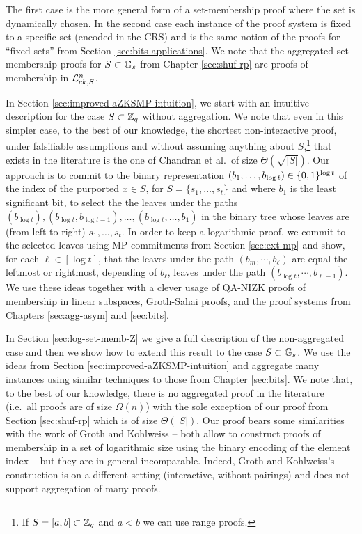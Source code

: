 The first case is the more general form of a set-membership proof where the set is dynamically chosen. In the second case each instance of the proof system is fixed to a specific set (encoded in the CRS) and is the same notion of the proofs for ``fixed sets'' from Section \ref{sec:bits-applications}. We note that the aggregated set-membership proofs for $S\subset\mathbb{G}_s$ from Chapter \ref{sec:shuf-rp} are proofs of membership in $\mathcal{L}_{ck,S}^n$.

In Section \ref{sec:improved-aZKSMP-intuition}, we start with an intuitive description for the case $S\subset\mathbb{Z}_q$ without aggregation. We note that even in this simpler case, to the best of our knowledge, the shortest non-interactive proof, under falsifiable assumptions and without assuming anything about $S$,\footnote{If $S=[a,b]\subset\mathbb{Z}_q$ and $a<b$ we can use range proofs.} that exists in the literature is the one of Chandran et al.~of size $\Theta(\sqrt{|S|})$.
Our approach is to commit to the binary representation $(b_1,\ldots,b_{\log t})\in\{0,1\}^{\log t}$ of the index of the purported $x\in S$, for $S=\{s_1,\ldots,s_t\}$ and where $b_1$ is the least significant bit, to select the the leaves under the paths $(b_{\log t}),(b_{\log t},b_{\log t-1}),\ldots,(b_{\log t},\ldots, b_1)$ in the binary tree whose leaves are (from left to right) $s_1,\ldots,s_t$. In order to keep a logarithmic proof, we commit to the selected leaves using MP commitments from Section \ref{sec:ext-mp} and show, for each $\ell\in[\log t]$, that the leaves under the path $(b_m,\cdots, b_{\ell})$ are equal the leftmost or rightmost, depending of $b_\ell$, leaves under the path $(b_{\log t},\cdots, b_{\ell-1})$. We use these ideas together with a clever usage of QA-NIZK proofs of membership in linear subspaces, Groth-Sahai proofs, and the proof systems from Chapters \ref{sec:agg-asym} and \ref{sec:bits}.

In Section \ref{sec:log-set-memb-Z} we give a full description of the non-aggregated case and then we show how to extend this result to the case $S\subset\mathbb{G}_s$. We use the ideas from Section \ref{sec:improved-aZKSMP-intuition} and aggregate many instances using similar techniques to those from Chapter \ref{sec:bits}. We note that, to the best of our knowledge, there is no aggregated proof in the literature (i.e.~all proofs are of size $\Omega(n)$) with the sole exception of our proof from Section \ref{sec:shuf-rp} which is of size $\Theta(|S|)$.  
Our proof bears some similarities with the work of Groth and Kohlweiss \cite{EC:GroKoh15} -- both allow to construct proofs of membership in a set of logarithmic size using the binary encoding of the element index -- but they are in general incomparable. Indeed, Groth and Kohlweiss's construction is on a different setting (interactive, without pairings) and does not support aggregation of many proofs.


